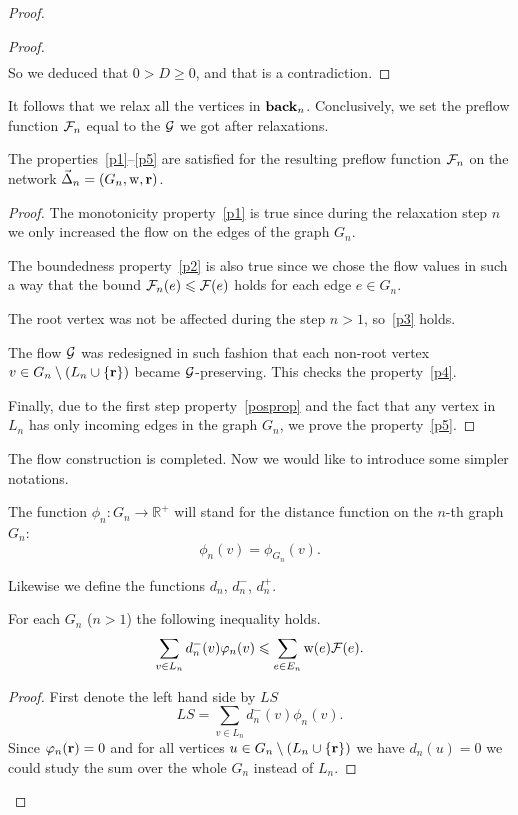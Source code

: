 \documentclass[12pt]{amsart}
\begin{document}
\begin{proof}
\begin{proof}
\[\begin{split}
        \end{split}
      \]
        So we deduced that $0 > D \geq 0$, and that is a contradiction.
      \end{proof}
      It follows that we relax all the vertices in $\eback_n$.
      Conclusively, we set the preflow function $\flowposn{n}$ equal to the $\cal{G}$ we got after relaxations.
      \begin{prop}
        The properties~\ref{p1}--\ref{p5} are satisfied for the resulting preflow function $\flowposn{n}$ on the network $\onet_n = (G_n, \wtp, \root)$.
      \end{prop}
      \begin{proof}
        The monotonicity property~\ref{p1} is true since during the relaxation step $n$ we
          only increased the flow on the edges of the graph $G_n$.

        The boundedness property~\ref{p2} is also true since we chose the flow values in such a way
          that the bound $\flowposn{n}(e) \leq \flowpos(e)$ holds for each edge $e\in G_n$.

        The root vertex was not be affected during the step $n > 1$, so~\ref{p3} holds.

        The flow $\cal{G}$ was redesigned in such fashion that each non-root vertex $v \in G_{n} \setminus 
          \left(L_n \cup \{\root\}\right)$ became $\cal{G}$-preserving.
        This checks the property~\ref{p4}.

        Finally, due to the first step property~\ref{posprop} and the fact that
        any vertex in $L_n$ has only incoming edges in the graph $G_n$, we prove the property~\ref{p5}.
      \end{proof}
      The flow construction is completed.
      Now we would like to introduce some simpler notations.
      \begin{definition}
        The function $\phi_n: G_n \to \mathbb{R}^{+}$ will stand for the distance function on the $n$-th graph $G_n$:
        \[
          \phi_n(v) = \phi_{G_n}(v).
        \]
      \end{definition}
      Likewise we define the functions $d_n$, $d^{-}_n$, $d^{+}_n$.
      \begin{lemma}
        For each $G_n$ ($n > 1$) the following inequality holds.
        \begin{equation}
          \label{main-ineq}
          \sum_{v\in L_n}d_{n}^{-}(v) \phi_n(v) \leq \sum_{e \in E_n} \wtp(e) \flowpos(e).
        \end{equation}
      \end{lemma}
      \begin{proof}
        First denote the left hand side by $LS$
        \[
          LS = \sum\limits_{v \in L_n} d_n^{-}(v) \phi_n(v).
        \]
        Since $\phi_n(\root) = 0$ and for all vertices $u \in G_{n} \setminus \left(L_n \cup \{\root\}\right)$
          we have $d_n(u) = 0$ we could study the sum over the whole $G_n$ instead of $L_n$.


\end{proof}
\end{proof}
\end{document}
